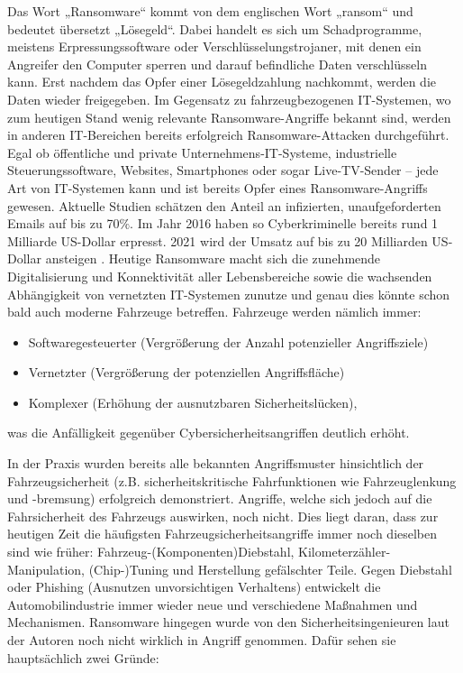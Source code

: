 Das Wort „Ransomware“ kommt von dem englischen Wort „ransom“ und 
bedeutet übersetzt „Lösegeld“. Dabei handelt es sich um Schadprogramme, 
meistens Erpressungssoftware oder Verschlüsselungstrojaner, mit denen ein 
Angreifer den Computer sperren und darauf befindliche Daten verschlüsseln 
kann. Erst nachdem das Opfer einer Lösegeldzahlung nachkommt, werden die 
Daten wieder freigegeben. 
\newline
Im Gegensatz zu fahrzeugbezogenen IT-Systemen, wo zum heutigen Stand wenig 
relevante Ransomware-Angriffe bekannt sind, werden in anderen IT-Bereichen 
bereits erfolgreich Ransomware-Attacken durchgeführt. Egal ob öffentliche und 
private Unternehmens-IT-Systeme, industrielle Steuerungssoftware, Websites, 
Smartphones oder sogar Live-TV-Sender – jede Art von IT-Systemen kann und ist 
bereits Opfer eines Ransomware-Angriffs gewesen. 
\newline
Aktuelle Studien schätzen den Anteil an infizierten, unaufgeforderten Emails auf 
bis zu 70$\%$. Im Jahr 2016 haben so Cyberkriminelle bereits rund 1 Milliarde US-Dollar 
erpresst. 2021 wird der Umsatz auf bis zu 20 Milliarden US-Dollar ansteigen \cite[vgl.]{C..24.05.2020}.  
\newline
Heutige Ransomware macht sich die zunehmende Digitalisierung und Konnektivität aller 
Lebensbereiche sowie die wachsenden Abhängigkeit von vernetzten IT-Systemen zunutze
und genau dies könnte schon bald auch moderne Fahrzeuge betreffen. 
Fahrzeuge werden nämlich immer:

\begin{itemize}
    \item Softwaregesteuerter (Vergrößerung der Anzahl potenzieller Angriffsziele)
    \item Vernetzter (Vergrößerung der potenziellen Angriffsfläche)
    \item Komplexer (Erhöhung der ausnutzbaren Sicherheitslücken),
\end{itemize}
was die Anfälligkeit gegenüber Cybersicherheitsangriffen deutlich erhöht. 

In der Praxis wurden bereits alle bekannten Angriffsmuster hinsichtlich der 
Fahrzeugsicherheit (z.B. sicherheitskritische Fahrfunktionen wie Fahrzeuglenkung 
und -bremsung) erfolgreich demonstriert. Angriffe, welche sich jedoch auf die 
Fahrsicherheit des Fahrzeugs auswirken, noch nicht. Dies liegt daran, dass zur 
heutigen Zeit die häufigsten Fahrzeugsicherheitsangriffe immer noch dieselben sind 
wie früher: Fahrzeug-(Komponenten)Diebstahl, Kilometerzähler-Manipulation, (Chip-)Tuning 
und Herstellung gefälschter Teile. 
\newline
Gegen Diebstahl oder Phishing (Ausnutzen unvorsichtigen Verhaltens) entwickelt die 
Automobilindustrie immer wieder neue und verschiedene Maßnahmen und Mechanismen. 
Ransomware hingegen wurde von den Sicherheitsingenieuren laut der Autoren noch nicht wirklich 
in Angriff genommen. Dafür sehen sie hauptsächlich zwei Gründe:


